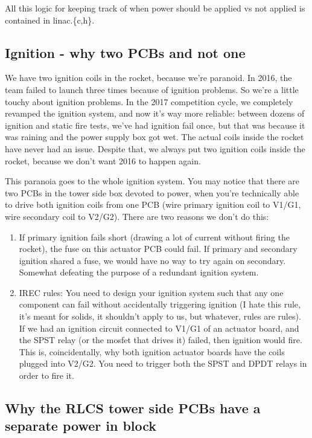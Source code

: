 \documentclass[11pt]{article}
\begin{document}
All this logic for keeping track of when power should be applied vs not
applied is contained in linac.\{c,h\}.

\subsection{Ignition - why two PCBs and not one}
\label{sec:org7107fc7}

We have two ignition coils in the rocket, because we're paranoid. In 2016,
the team failed to launch three times because of ignition
problems. So we're a little touchy about ignition problems. In the 2017
competition cycle, we completely revamped the ignition system, and now it's
way more reliable: between dozens of ignition and static fire tests, we've
had ignition fail once, but that was because it was raining and the power
supply box got wet. The actual coils inside the rocket have never had an
issue. Despite that, we always put two ignition coils inside the rocket,
because we don't want 2016 to happen again.

This paranoia goes to the whole ignition system. You may notice that there
are two PCBs in the tower side box devoted to power, when you're
technically able to drive both ignition coils from one PCB (wire primary
ignition coil to V1/G1, wire secondary coil to V2/G2). There are two
reasons we don't do this:

\begin{enumerate}
\item If primary ignition fails short (drawing a lot of current without firing
the rocket), the fuse on this actuator PCB could fail. If primary and
secondary ignition shared a fuse, we would have no way to try again on
secondary. Somewhat defeating the purpose of a redundant ignition
system.
\item IREC rules: You need to design your ignition system such that any one
component can fail without accidentally triggering ignition (I hate this
rule, it's meant for solids, it shouldn't apply to us, but whatever,
rules are rules). If we had an ignition circuit connected to V1/G1 of an
actuator board, and the SPST relay (or the mosfet that drives it)
failed, then ignition would fire. This is, coincidentally, why both
ignition actuator boards have the coils plugged into V2/G2. You need to
trigger both the SPST and DPDT relays in order to fire it.
\end{enumerate}

\subsection{Why the RLCS tower side PCBs have a separate power in block}
\label{sec:orgf54ef98}
\end{document}
